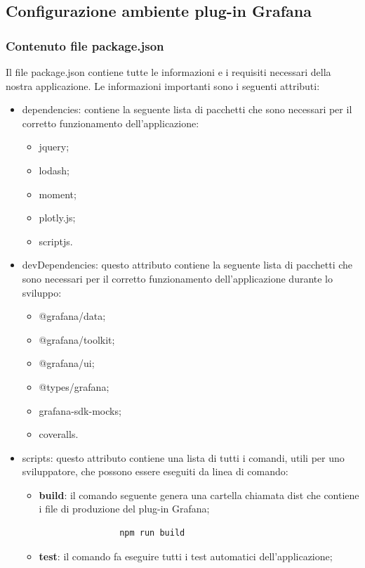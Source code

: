 \subsection{Configurazione ambiente plug-in Grafana}
\subsubsection{Contenuto file package.json}
Il file package.json contiene tutte le informazioni e i requisiti necessari della nostra applicazione. Le informazioni importanti sono i seguenti attributi:
\begin{itemize}
	\item dependencies: contiene la seguente lista di pacchetti che sono necessari per il corretto funzionamento dell'applicazione:
		\begin{itemize}
			\item jquery;
			\item lodash;
			\item moment;
			\item plotly.js;
			\item scriptjs.
		\end{itemize}
	\item devDependencies: questo attributo contiene la seguente lista di pacchetti che sono necessari per il corretto funzionamento dell'applicazione durante lo sviluppo:
		\begin{itemize}
			\item @grafana/data;
			\item @grafana/toolkit;
			\item @grafana/ui;
			\item @types/grafana;
			\item grafana-sdk-mocks;
			\item coveralls.
		\end{itemize}
	\item{scripts}: questo attributo contiene una lista di tutti i comandi, utili per uno sviluppatore, che possono essere eseguiti da linea di comando:
		\begin{itemize}
			\item \textbf{build}: il comando seguente genera una cartella chiamata dist che contiene i file di produzione del plug-in Grafana\glo;
			\begin{verbatim}
				npm run build
			\end{verbatim}
			\item \textbf{test}: il comando fa eseguire tutti i test automatici dell'applicazione;

\end{itemize}
\end{itemize}
